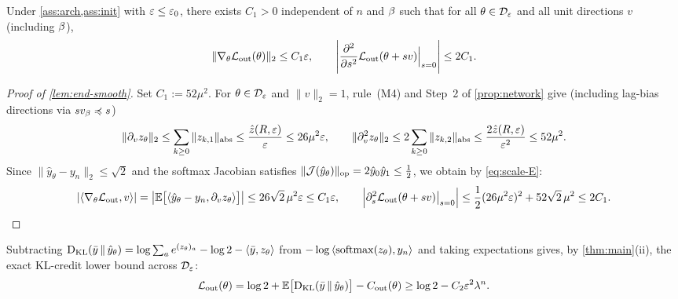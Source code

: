 \begin{lemma}
\label{lem:end-smooth}
Under \cref{ass:arch,ass:init} with $\varepsilon \le \varepsilon_0$, there exists $C_1 > 0$ independent of $n$ and $\beta$ such that for all $\theta \in \mathcal D_{\varepsilon}$ and all unit directions $v$ (including $\beta$),
\[
 \|\nabla_\theta\mathcal L_{\mathrm{out}}(\theta)\|_2 \le C_1\varepsilon, \qquad
 \Biggl|\frac{\partial^2}{\partial s^2}\mathcal L_{\mathrm{out}}(\theta + s v)\Big|_{s=0}\Biggr| \le 2C_1.
\]
\end{lemma}
\begin{proof}[Proof of \cref{lem:end-smooth}]
Set $C_1 := 52\mu^2$. For $\theta \in \mathcal D_{\varepsilon}$ and $\|v\|_2 = 1$, rule~(M4) and Step~2 of \cref{prop:network} give (including lag-bias directions via $s v_\beta \preccurlyeq s$)
\[
  \|\partial_v z_\theta\|_2 \le \sum_{k\ge 0} \|z_{k,1}\|_{\mathrm{abs}} \le \frac{\hat z(R,\varepsilon)}{\varepsilon} \le 26\mu^2\varepsilon,
  \qquad
  \|\partial_v^2 z_\theta\|_2 \le 2\sum_{k\ge 0} \|z_{k,2}\|_{\mathrm{abs}} \le \frac{2\hat z(R,\varepsilon)}{\varepsilon^2} \le 52\mu^2.
\]
Since $\|\hat y_\theta - y_n\|_2 \le \sqrt 2$ and the softmax Jacobian satisfies $\|\mathcal J(\hat y_\theta)\|_{\mathrm{op}} = 2\hat y_0\hat y_1 \le \frac{1}{2}$, we obtain by \cref{eq:scale-E}:
\[
  \lvert\langle\nabla_\theta\mathcal L_{\mathrm{out}}, v\rangle\rvert
  = \bigl|\mathbb E\bigl[\langle\hat y_\theta - y_n, \partial_v z_\theta\rangle\bigr]\bigr|
  \le 26\sqrt 2\,\mu^2\varepsilon \le C_1\varepsilon,
  \qquad
  \Bigl|\partial_s^2\mathcal L_{\mathrm{out}}(\theta+sv)\big|_{s=0}\Bigr|
  \le \frac{1}{2}(26\mu^2\varepsilon)^2 + 52\sqrt 2\,\mu^2 \le 2C_1.\qedhere
\]
\end{proof}

Subtracting $\mathrm{D}_{\mathrm{KL}}(\bar y \,\|\, \hat y_\theta) = \log\sum_a e^{(z_\theta)_a} - \log 2 - \langle\bar y, z_\theta\rangle$ from $-\log\left\langle \operatorname{softmax}(z_\theta),y_n\right\rangle$ and taking expectations gives, by \cref{thm:main}(ii), the exact KL-credit lower bound across $\mathcal D_{\varepsilon}$:
\begin{equation}
 \mathcal L_{\mathrm{out}}(\theta)
 = \log 2 + \mathbb E\bigl[\mathrm{D}_{\mathrm{KL}}(\bar y \,\|\, \hat y_\theta)\bigr] - C_{\mathrm{out}}(\theta)
 \ge \log 2 - C_2\varepsilon^2\lambda^n.
 \label{eq:lo-identity}
\end{equation}

